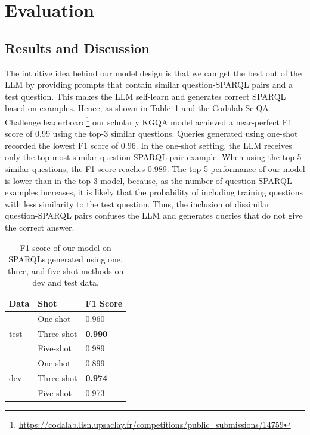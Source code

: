 \documentclass[
]{ceurart}
\begin{document}
\section{Evaluation}\label{eval}

\subsection{Results and Discussion}\label{result-discussion}

The intuitive idea behind our model design is that we can get the best out of the LLM by providing prompts that contain similar question-SPARQL pairs and a test question. This makes the LLM self-learn and generates correct SPARQL based on examples. Hence, as shown in Table~\ref{tab:eval_results} and the Codalab SciQA Challenge leaderboard\footnote{\url{https://codalab.lisn.upsaclay.fr/competitions/public\_submissions/14759}} our scholarly KGQA model achieved a near-perfect F1 score of 0.99 using the top-3 similar questions. Queries generated using one-shot recorded the lowest F1 score of 0.96. In the one-shot setting, the LLM receives only the top-most similar question SPARQL pair example. %
When using the top-5 similar questions, the F1 score reaches 0.989. The top-5 performance of our model is lower than in the top-3 model, because, as the number of question-SPARQL examples increases, it is likely that the probability of including training questions with less similarity to the test question. Thus, the inclusion of dissimilar question-SPARQL pairs confuses the LLM and generates queries that do not give the correct answer.

\begin{table}[htb!]
  \caption{F1 score of our model on SPARQLs generated using one, three, and five-shot methods on dev and test data.}
  \label{tab:eval_results}
  \begin{tabular}{lll}
    \toprule
    Data & Shot & F1 Score\\
    \midrule
    & One-shot & 0.960  \\
    test & Three-shot & \textbf{0.990} \\
    & Five-shot & 0.989 \\
    \midrule
    & One-shot & 0.899  \\
    dev & Three-shot & \textbf{0.974} \\
    & Five-shot & 0.973 \\
    \bottomrule
  \end{tabular}
\end{table}
\end{document}

